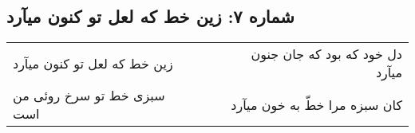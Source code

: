 \begin{center}
\section*{شماره ۷: زین خط که لعل تو کنون میآرد}
\label{sec:007}
\begin{longtable}{l p{0.5cm} r}
زین خط که لعل تو کنون میآرد
&&
دل خود که بود که جان جنون میآرد
\\
سبزی خط تو سرخ روئی من است
&&
کان سبزه مرا خطّ به خون میآرد
\\
\end{longtable}
\end{center}
